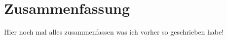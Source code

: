 \chapter{Zusammenfassung}
\label{ch:zusammenfassung}
Hier noch mal alles zusammenfassen was ich vorher so geschrieben habe!
